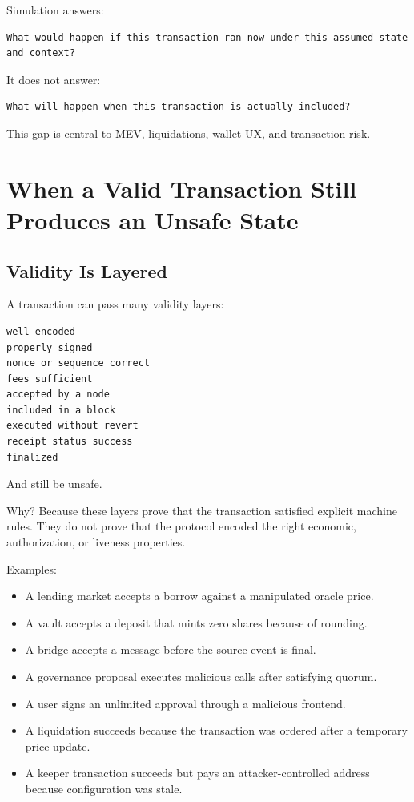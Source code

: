 Simulation answers:

\begin{lstlisting}
What would happen if this transaction ran now under this assumed state and context?
\end{lstlisting}

It does not answer:

\begin{lstlisting}
What will happen when this transaction is actually included?
\end{lstlisting}

This gap is central to MEV, liquidations, wallet UX, and transaction
risk.

\section{When a Valid Transaction Still Produces an Unsafe State}

\subsection{Validity Is Layered}

A transaction can pass many validity layers:

\begin{lstlisting}
well-encoded
properly signed
nonce or sequence correct
fees sufficient
accepted by a node
included in a block
executed without revert
receipt status success
finalized
\end{lstlisting}

And still be unsafe.

Why? Because these layers prove that the transaction satisfied explicit
machine rules. They do not prove that the protocol encoded the right
economic, authorization, or liveness properties.

Examples:

\begin{itemize}
\tightlist
\item
  A lending market accepts a borrow against a manipulated oracle price.
\item
  A vault accepts a deposit that mints zero shares because of rounding.
\item
  A bridge accepts a message before the source event is final.
\item
  A governance proposal executes malicious calls after satisfying
  quorum.
\item
  A user signs an unlimited approval through a malicious frontend.
\item
  A liquidation succeeds because the transaction was ordered after a
  temporary price update.
\item
  A keeper transaction succeeds but pays an attacker-controlled address
  because configuration was stale.
\end{itemize}

